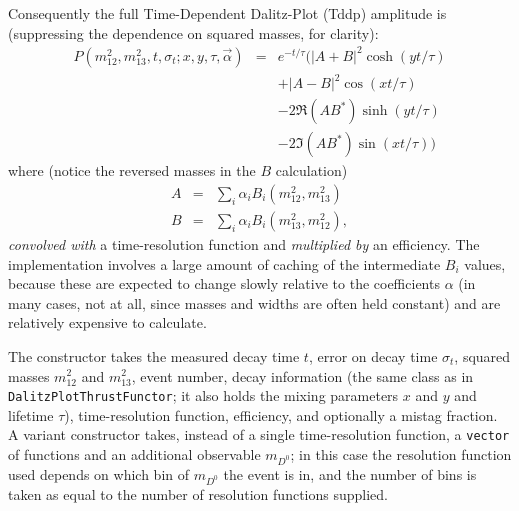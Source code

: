 \documentclass[12pt,pdflatex]{article}
\begin{document}
\begin{itemize}
Consequently the full Time-Dependent Dalitz-Plot (Tddp) amplitude is (suppressing
the dependence on squared masses, for clarity):
\begin{eqnarray}
\label{eq:fullmix}
P(m^2_{12}, m^2_{13}, t, \sigma_t;x,y,\tau,\vec\alpha) &=&
e^{-t/\tau}\Big(|A+B|^2\cosh(yt/\tau)\\
&& + |A-B|^2\cos(xt/\tau)\\
&& - 2\Re(AB^*)\sinh(yt/\tau)\\
&& - 2\Im(AB^*)\sin(xt/\tau)\Big)
\end{eqnarray}
where (notice the reversed masses in the $B$ calculation)
\begin{eqnarray}
A &=& \sum\limits_i \alpha_iB_i(m^2_{12}, m^2_{13}) \\
B &=& \sum\limits_i \alpha_iB_i(m^2_{13}, m^2_{12}), 
\end{eqnarray}
\emph{convolved with} a time-resolution function and \emph{multiplied by} an efficiency. 
The implementation involves a large
amount of caching of the intermediate $B_i$ values, because these are expected
to change slowly relative to the coefficients $\alpha$ (in many cases, not at all, 
since masses and widths are often held constant) and are relatively expensive to calculate. 

The constructor takes the measured decay time $t$, error on decay time $\sigma_t$, 
squared masses $m^2_{12}$ and $m^2_{13}$, event number, decay information (the same
class as in \texttt{DalitzPlotThrustFunctor}; it also holds the mixing parameters
$x$ and $y$ and lifetime $\tau$), time-resolution function, efficiency, and optionally
a mistag fraction. A variant constructor takes, instead of a single time-resolution
function, a \texttt{vector} of functions and an additional observable $m_{D^0}$;
in this case the resolution function used depends on which bin of $m_{D^0}$ the event
is in, and the number of bins is taken as equal to the number of resolution functions
supplied. 


\end{itemize}
\end{document}
